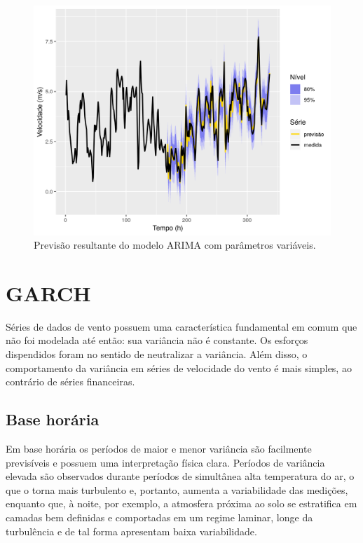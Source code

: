 \documentclass[
	12pt,				%
	openright,			%
	oneside,			%
	a4paper,			%
	english,			%
	french,				%
	spanish,			%
	brazil				%
	]{abntex2}
\begin{document}
\begin{figure}[h]
    \centering
	\includegraphics[width=\textwidth]{var_result}
	\caption{Previsão resultante do modelo ARIMA com parâmetros variáveis.}
\end{figure}
\FloatBarrier

\chapter{GARCH}

Séries de dados de vento possuem uma característica fundamental em comum que não foi modelada até então: sua variância não é constante. Os esforços dispendidos foram no sentido de neutralizar a variância. Além disso, o comportamento da variância em séries de velocidade do vento é mais simples, ao contrário de séries financeiras.

\section{Base horária}

Em base horária os períodos de maior e menor variância são facilmente previsíveis e possuem uma interpretação física clara. Períodos de variância elevada são observados durante períodos de simultânea alta temperatura do ar, o que o torna mais turbulento e, portanto, aumenta a variabilidade das medições, enquanto que, à noite, por exemplo, a atmosfera próxima ao solo se estratifica em camadas bem definidas e comportadas em um regime laminar, longe da turbulência e de tal forma apresentam baixa variabilidade.
\end{document}
